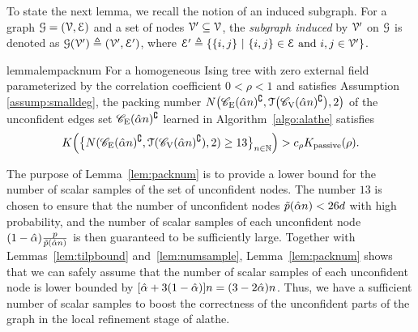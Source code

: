 To state the next lemma, we recall the notion of an induced subgraph. For a graph $\mathcal{G}=(\mathcal{V},\mathcal{E})$ and a set of nodes $\mathcal{V}^{\prime}\subseteq \mathcal{V}$, the  {\em subgraph induced} by $\mathcal{V}^{\prime}$ on $\mathcal{G}$ is   denoted as $\mathcal{G}(\mathcal{V}^{\prime}) \triangleq (\mathcal{V}^{\prime},\mathcal{E}^{\prime})$, where 
$\mathcal{E}^{\prime}\triangleq\{\{i,j\}\ | \ \{i,j\}\in \mathcal{E} \text{ and }i,j\in\mathcal{V}^{\prime}\}$. 

\begin{restatable}{lemma}{lempacknum}
\label{lem:packnum}
For a homogeneous Ising tree with zero external field  parameterized by the correlation coefficient $0<\rho<1$ and satisfies Assumption \ref{assump:smalldeg}, the packing number $N\big(\mathscr{C}_{\mathrm{E}}(\hat{\alpha} n)^{\complement},\mathcal{T}\big(\mathscr{C}_{\mathrm{V}}(\hat{\alpha} n)^{\complement}\big),2\big)$ of the unconfident edges set $\mathscr{C}_{\mathrm{E}}(\hat{\alpha} n)^{\complement}$ 
learned in Algorithm~\ref{algo:alathe} satisfies
\begin{align}
	K\Big(\big\{N(\mathscr{C}_{\mathrm{E}}(\hat{\alpha} n)^{\complement},\mathcal{T}(\mathscr{C}_{\mathrm{V}}(\hat{\alpha} n)^{\complement}),2)\geq 13\big\}_{n\in\mathbb{N}}\Big)>c_{\rho}K _{{\rm passive}}(\rho).
\end{align}
\end{restatable}
The purpose of Lemma~\ref{lem:packnum} is to provide a lower bound for the number of scalar samples of the set of unconfident nodes. The number $13$ is chosen to ensure that the number of unconfident nodes $\tilde{p}(\hat{\alpha} n)<26d$ with high probability, and the number of scalar samples of each unconfident node $(1-\hat{\alpha})\frac{p}{\tilde{p}(\hat{\alpha} n)}$ is then guaranteed to be sufficiently large. Together with Lemmas~\ref{lem:tilpbound} and~\ref{lem:numsample}, Lemma~\ref{lem:packnum} shows that we can safely assume   that the number of scalar samples of each unconfident node is lower bounded by $[\hat{\alpha}+3(1-\hat{\alpha})]n=(3-2\hat{\alpha})n$. Thus, we have a sufficient number of scalar samples to boost the correctness of the unconfident parts of the graph in the local refinement stage of \ac{alathe}. 

